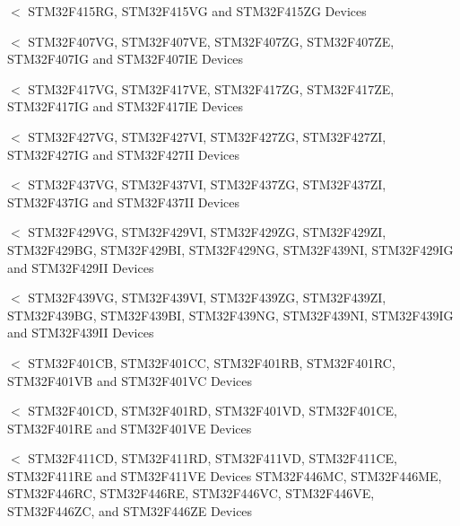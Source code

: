$<$ S\+T\+M32\+F415\+RG, S\+T\+M32\+F415\+VG and S\+T\+M32\+F415\+ZG Devices

$<$ S\+T\+M32\+F407\+VG, S\+T\+M32\+F407\+VE, S\+T\+M32\+F407\+ZG, S\+T\+M32\+F407\+ZE, S\+T\+M32\+F407\+IG and S\+T\+M32\+F407\+IE Devices

$<$ S\+T\+M32\+F417\+VG, S\+T\+M32\+F417\+VE, S\+T\+M32\+F417\+ZG, S\+T\+M32\+F417\+ZE, S\+T\+M32\+F417\+IG and S\+T\+M32\+F417\+IE Devices

$<$ S\+T\+M32\+F427\+VG, S\+T\+M32\+F427\+VI, S\+T\+M32\+F427\+ZG, S\+T\+M32\+F427\+ZI, S\+T\+M32\+F427\+IG and S\+T\+M32\+F427\+II Devices

$<$ S\+T\+M32\+F437\+VG, S\+T\+M32\+F437\+VI, S\+T\+M32\+F437\+ZG, S\+T\+M32\+F437\+ZI, S\+T\+M32\+F437\+IG and S\+T\+M32\+F437\+II Devices

$<$ S\+T\+M32\+F429\+VG, S\+T\+M32\+F429\+VI, S\+T\+M32\+F429\+ZG, S\+T\+M32\+F429\+ZI, S\+T\+M32\+F429\+BG, S\+T\+M32\+F429\+BI, S\+T\+M32\+F429\+NG, S\+T\+M32\+F439\+NI, S\+T\+M32\+F429\+IG and S\+T\+M32\+F429\+II Devices

$<$ S\+T\+M32\+F439\+VG, S\+T\+M32\+F439\+VI, S\+T\+M32\+F439\+ZG, S\+T\+M32\+F439\+ZI, S\+T\+M32\+F439\+BG, S\+T\+M32\+F439\+BI, S\+T\+M32\+F439\+NG, S\+T\+M32\+F439\+NI, S\+T\+M32\+F439\+IG and S\+T\+M32\+F439\+II Devices

$<$ S\+T\+M32\+F401\+CB, S\+T\+M32\+F401\+CC, S\+T\+M32\+F401\+RB, S\+T\+M32\+F401\+RC, S\+T\+M32\+F401\+VB and S\+T\+M32\+F401\+VC Devices

$<$ S\+T\+M32\+F401\+CD, S\+T\+M32\+F401\+RD, S\+T\+M32\+F401\+VD, S\+T\+M32\+F401\+CE, S\+T\+M32\+F401\+RE and S\+T\+M32\+F401\+VE Devices

$<$ S\+T\+M32\+F411\+CD, S\+T\+M32\+F411\+RD, S\+T\+M32\+F411\+VD, S\+T\+M32\+F411\+CE, S\+T\+M32\+F411\+RE and S\+T\+M32\+F411\+VE Devices S\+T\+M32\+F446\+MC, S\+T\+M32\+F446\+ME, S\+T\+M32\+F446\+RC, S\+T\+M32\+F446\+RE, S\+T\+M32\+F446\+VC, S\+T\+M32\+F446\+VE, S\+T\+M32\+F446\+ZC, and S\+T\+M32\+F446\+ZE Devices 